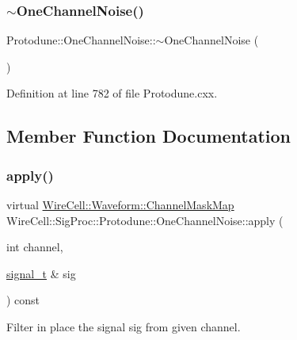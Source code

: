 \subsubsection{\texorpdfstring{$\sim$\+One\+Channel\+Noise()}{~OneChannelNoise()}}
{\footnotesize\ttfamily Protodune\+::\+One\+Channel\+Noise\+::$\sim$\+One\+Channel\+Noise (\begin{DoxyParamCaption}{ }\end{DoxyParamCaption})\hspace{0.3cm}{\ttfamily [virtual]}}



Definition at line 782 of file Protodune.\+cxx.



\subsection{Member Function Documentation}
\mbox{\label{class_wire_cell_1_1_sig_proc_1_1_protodune_1_1_one_channel_noise_a7d891c87a8867d57fc4b6ac86d226876}} 
\subsubsection{\texorpdfstring{apply()}{apply()}\hspace{0.1cm}{\footnotesize\ttfamily [1/2]}}
{\footnotesize\ttfamily virtual \hyperlink{namespace_wire_cell_1_1_waveform_a18b9ae61c858e340252ba3ac83ac3bc0}{Wire\+Cell\+::\+Waveform\+::\+Channel\+Mask\+Map} Wire\+Cell\+::\+Sig\+Proc\+::\+Protodune\+::\+One\+Channel\+Noise\+::apply (\begin{DoxyParamCaption}\item[{int}]{channel,  }\item[{\hyperlink{class_wire_cell_1_1_i_channel_filter_a434ed96cc4b805fa0eeec14f9f8d85e9}{signal\+\_\+t} \&}]{sig }\end{DoxyParamCaption}) const\hspace{0.3cm}{\ttfamily [virtual]}}

Filter in place the signal {\ttfamily sig} from given {\ttfamily channel}. 

